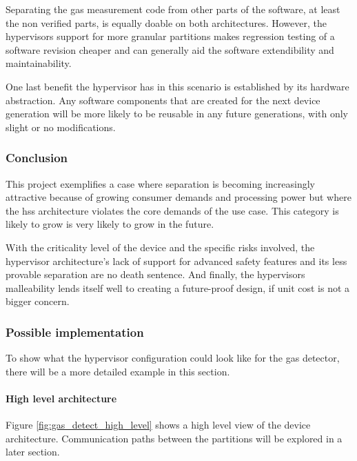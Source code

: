Separating the gas measurement code from other parts of the software, at least the non verified parts, is equally doable on both architectures. However, the hypervisors support for more granular partitions makes regression testing of a software revision cheaper and can generally aid the software extendibility and maintainability.

One last benefit the hypervisor has in this scenario is established by its hardware abstraction. Any software components that are created for the next device generation will be more likely to be reusable in any future generations, with only slight or no modifications.
\subsubsection{Conclusion}
This project exemplifies a case where separation is becoming increasingly attractive because of growing consumer demands and processing power but where the \acrshort{hss} architecture violates the core demands of the use case. This category is likely to grow is very likely to grow in the future\cite{ITA.May2016}.

With the criticality level of the device and the specific risks involved, the hypervisor architecture's lack of support for advanced safety features and its less provable separation are no death sentence. And finally, the hypervisors malleability lends itself well to creating a future-proof design, if unit cost is not a bigger concern. 
\subsubsection{Possible implementation}
To show what the hypervisor configuration could look like for the gas detector, there will be a more detailed example in this section.

\paragraph{High level architecture}
Figure \ref{fig:gas_detect_high_level} shows a high level view of the device architecture. Communication paths between the partitions will be explored in a later section.

